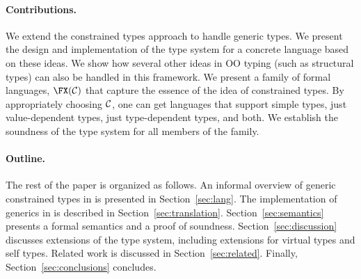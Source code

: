 \paragraph{Contributions.}
We extend the constrained types approach to handle generic types.  We
present the design and implementation of the type system for a
concrete language \Xten{} based on these ideas. We show how several
other ideas in OO typing (such as structural types) can also be
handled in this framework. We present a family of formal languages,
$\FX(\cal C)$ that capture the essence of the idea of constrained
types. By appropriately choosing $\cal C$, one can get languages that
support simple types, just value-dependent types, just type-dependent
types, and both. We establish the soundness of the type system for all
members of the family.

\paragraph{Outline.}

The rest of the paper is organized as follows.
%
An informal overview of generic constrained types in \Xten{}
is presented in
Section~\ref{sec:lang}.
%
 The implementation of generics in \Xten{} is
described in Section~\ref{sec:translation}.
%
Section~\ref{sec:semantics} presents a formal semantics and a
proof of soundness.
%
Section~\ref{sec:discussion} discusses extensions of the type system,
including extensions for virtual types and self types.
%
Related work is discussed in Section~\ref{sec:related}.
%
Finally, Section~\ref{sec:conclusions} concludes.


